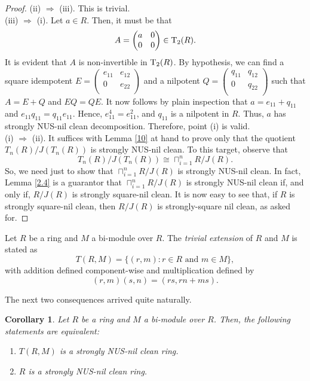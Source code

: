 \documentclass[12pt]{amsart}
\newtheorem{corollary}[theorem]{Corollary}
\theoremstyle{definition}
\begin{document}
\begin{proof}
(ii) $\Rightarrow$ (iii). This is trivial.\\
(iii) $\Rightarrow$ (i). Let $a\in R$. Then, it must be that
$$A=\begin{pmatrix}
	a & 0 \\
	0& 0 \\
\end{pmatrix}\in {\rm T}_2(R).$$ It is evident that $A$ is non-invertible in ${\rm T}_2(R)$. By hypothesis, we can find a square idempotent
$E=\begin{pmatrix}
	e_{11} &e_{12} \\
	0& e_{22}  \\
\end{pmatrix}$ and a nilpotent
$Q=\begin{pmatrix}
	q_{11} &q_{12} \\
	0& q_{22}  \\
\end{pmatrix}$ such that
$A=E+Q$ and $EQ=QE$. It now follows by plain inspection that $a=e_{11}+q_{11}$ and $e_{11}q_{11}=q_{11}e_{11}$. Hence, $e_{11}^4=e_{11}^2$, and $q_{11}$ is a nilpotent in $R$. Thus, $a$ has strongly NUS-nil clean decomposition. Therefore, point (i) is valid.\\
(i) $\Rightarrow$ (ii). It suffices with Lemma \ref{10} at hand to prove only that the quotient $T_n(R)/J(T_n(R))$ is strongly NUS-nil clean. To this target, observe that $$T_n(R)/J(T_n(R))\cong \sqcap_{i=1}^nR/J(R).$$ So, we need just to show that $\sqcap_{i=1}^nR/J(R)$ is strongly NUS-nil clean. In fact, Lemma \ref{2.4} is a guarantor that $\sqcap_{i=1}^nR/J(R)$ is strongly NUS-nil clean if, and only if, $R/J(R)$ is strongly square-nil clean. It is now easy to see that, if $R$ is strongly square-nil clean, then $R/J(R)$ is strongly-square nil clean, as asked for.
\end{proof}

Let $R$ be a ring and $M$ a bi-module over $R$. The {\it trivial extension} of $R$ and $M$ is stated as
\[ T(R, M) = \{(r, m) : r \in R \text{ and } m \in M\}, \]
with addition defined component-wise and multiplication defined by
\[ (r, m)(s, n) = (rs, rn + ms). \]

\medskip

The next two consequences arrived quite naturally.

\begin{corollary}\label{2.17}
Let $R$ be a ring and $M$ a bi-module over $R$. Then, the following statements are equivalent:
\begin{enumerate}
\item
$T(R, M)$ is a strongly NUS-nil clean ring.
\item
$R$ is a strongly NUS-nil clean ring.
\end{enumerate}
\end{corollary}
\end{document}
